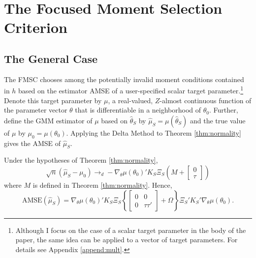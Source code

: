 \section{The Focused Moment Selection Criterion}
\label{sec:FMSC}

\subsection{The General Case}
The FMSC chooses among the potentially invalid moment conditions contained in $h$ based on the estimator AMSE of a user-specified scalar target parameter.\footnote{Although I focus on the case of a scalar target parameter in the body of the paper, the same idea can be applied to a vector of target parameters. For details see Appendix \ref{append:mult}.}
Denote this target parameter by $\mu$, a real-valued, $Z$-almost continuous function of the parameter vector $\theta$ that is differentiable in a neighborhood of $\theta_0$. 
Further, define the GMM estimator of $\mu$ based on $\widehat{\theta}_S$ by $\widehat{\mu}_S = \mu(\widehat{\theta}_S)$ and the true value of $\mu$ by $\mu_0 = \mu(\theta_0)$. 
Applying the Delta Method to Theorem \ref{thm:normality} gives the AMSE of $\widehat{\mu}_S$.

\begin{cor}
\label{cor:target}
Under the hypotheses of Theorem \ref{thm:normality}, 
$$\sqrt{n}\left(\widehat{\mu}_S - \mu_0\right)\rightarrow_d-\nabla_\theta\mu(\theta_0)'K_S \Xi_S \left(M +  \left[\begin{array}
	{c} 0 \\ \tau
\end{array} \right]\right)$$ 
where $M$ is defined in Theorem \ref{thm:normality}.
Hence,
	$$\mbox{AMSE}\left(\widehat{\mu}_S\right) = \nabla_\theta\mu(\theta_0)'K_S \Xi_S \left\{\left[\begin{array}{cc}0&0\\0&\tau\tau'\end{array}\right] + \Omega\right\}\Xi_S'K_S'\nabla_\theta\mu(\theta_0).$$
\end{cor}

